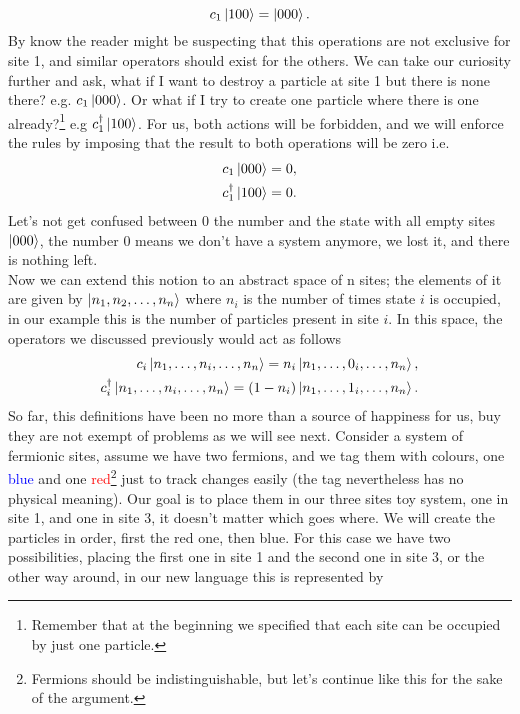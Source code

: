 \begin{equation*}
    c_1 \ket{100} = \ket{000}.
\end{equation*}
By know the reader might be suspecting that this operations are not exclusive for site 1, and similar operators should exist for the others. We can take our curiosity further and ask, what if I want to destroy a particle at site 1 but there is none there? e.g. $c_1\ket{000}$. Or what if I try to create one particle where there is one already?\footnote{Remember that at the beginning we specified that each site can be occupied by just one particle.} e.g $c_1^\dagger\ket{100}$. For us, both actions will be forbidden, and we will enforce the rules by imposing that the result to both operations will be zero i.e.
\begin{eqnarray}
    c_1\ket{000} = 0,\nonumber\\
    c_1^\dagger\ket{100} = 0.\nonumber
\end{eqnarray}
Let's not get confused between 0 the number and the state with all empty sites $\ket{000}$, the number $0$ means we don't have a system anymore, we lost it, and there is nothing left.\\

Now we can extend this notion to an abstract space of n sites; the elements of it are given by $\ket{n_1,n_2,\ldots,n_n}$ where $n_i$ is the number of times state $i$ is occupied, in our example this is the number of particles present in site $i$. In this space, the operators we discussed previously would act as follows 
\begin{eqnarray}
    c_i \ket{n_1,\ldots,n_i,\ldots,n_n} = n_i\ket{n_1,\ldots,0_i,\ldots,n_n},\label{def1.1}\\
    c_i^\dagger \ket{n_1,\ldots,n_i,\ldots,n_n} = (1-n_i)\ket{n_1,\ldots,1_i,\ldots,n_n}.\label{def1.2}
\end{eqnarray}
So far, this definitions have been no more than a source of happiness for us, buy they are not exempt of problems as we will see next. Consider a system of fermionic sites, assume we have two fermions, and we tag them with colours, one \textcolor{blue}{blue} and one \textcolor{red}{red}\footnote{Fermions should be indistinguishable, but let's continue like this for the sake of the argument.} just to track changes easily (the tag nevertheless has no physical meaning). Our goal is to place them in our three sites toy system, one in site 1, and one in site 3, it doesn't matter which goes where. We will create the particles in order, first the red one, then blue. For this case we have two possibilities, placing the first one in site 1 and the second one in site 3, or the other way around, in our new language this is represented by

